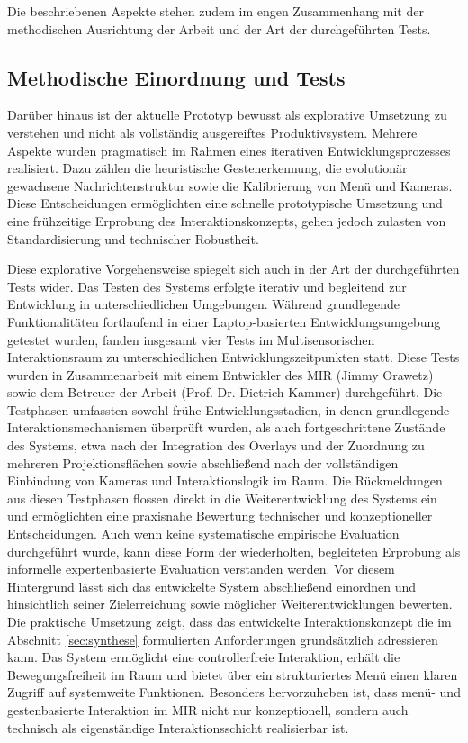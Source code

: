 Die beschriebenen Aspekte stehen zudem im engen Zusammenhang mit der methodischen Ausrichtung der Arbeit und der Art der durchgeführten Tests.


\subsection{Methodische Einordnung und Tests}
Darüber hinaus ist der aktuelle Prototyp bewusst als explorative Umsetzung zu verstehen und nicht als vollständig ausgereiftes Produktivsystem. Mehrere Aspekte wurden pragmatisch im Rahmen eines iterativen Entwicklungsprozesses realisiert. Dazu zählen die heuristische Gestenerkennung, die evolutionär gewachsene Nachrichtenstruktur sowie die Kalibrierung von Menü und Kameras. Diese Entscheidungen ermöglichten eine schnelle prototypische Umsetzung und eine frühzeitige Erprobung des Interaktionskonzepts, gehen jedoch zulasten von Standardisierung und technischer Robustheit.

Diese explorative Vorgehensweise spiegelt sich auch in der Art der durchgeführten Tests wider. Das Testen des Systems erfolgte iterativ und begleitend zur Entwicklung in unterschiedlichen Umgebungen. Während grundlegende Funktionalitäten fortlaufend in einer Laptop-basierten Entwicklungsumgebung getestet wurden, fanden insgesamt vier Tests im Multisensorischen Interaktionsraum zu unterschiedlichen Entwicklungszeitpunkten statt.
Diese Tests wurden in Zusammenarbeit mit einem Entwickler des MIR (Jimmy Orawetz) sowie dem Betreuer der Arbeit (Prof. Dr. \mbox{Dietrich} Kammer) durchgeführt. Die Testphasen umfassten sowohl frühe Entwicklungsstadien, in denen grundlegende Interaktionsmechanismen überprüft wurden, als auch fortgeschrittene Zustände des Systems, etwa nach der Integration des Overlays und der Zuordnung zu mehreren Projektionsflächen sowie abschließend nach der vollständigen Einbindung von Kameras und Interaktionslogik im Raum.
Die Rückmeldungen aus diesen Testphasen flossen direkt in die Weiterentwicklung des Systems ein und ermöglichten eine praxisnahe Bewertung technischer und konzeptioneller Entscheidungen. Auch wenn keine systematische empirische Evaluation durchgeführt wurde, kann diese Form der wiederholten, begleiteten Erprobung als informelle expertenbasierte Evaluation verstanden werden.
Vor diesem Hintergrund lässt sich das entwickelte System abschließend einordnen und hinsichtlich seiner Zielerreichung sowie möglicher Weiterentwicklungen bewerten. \\

Die praktische Umsetzung zeigt, dass das entwickelte Interaktionskonzept die im Abschnitt \ref{sec:synthese} formulierten Anforderungen grundsätzlich adressieren kann. Das System ermöglicht eine controllerfreie Interaktion, erhält die Bewegungsfreiheit im Raum und bietet über ein strukturiertes Menü einen klaren Zugriff auf systemweite Funktionen. Besonders hervorzuheben ist, dass menü- und gestenbasierte Interaktion im MIR nicht nur konzeptionell, sondern auch technisch als eigenständige Interaktionsschicht realisierbar ist.



